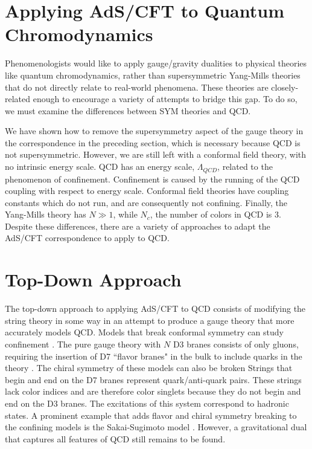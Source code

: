 \section{Applying AdS/CFT to Quantum Chromodynamics}

Phenomenologists would like to apply gauge/gravity dualities to physical theories like quantum chromodynamics, rather than supersymmetric Yang-Mills theories that do not directly relate to real-world phenomena.
These theories are closely-related enough to encourage a variety of attempts to bridge this gap.
To do so, we must examine the differences between SYM theories and QCD.

We have shown how to remove the supersymmetry aspect of the gauge theory in the correspondence in the preceding section, which is necessary because QCD is not supersymmetric.
However, we are still left with a conformal field theory, with no intrinsic energy scale.
QCD has an energy scale, $\Lambda_{QCD}$, related to the phenomenon of confinement.
Confinement is caused by the running of the QCD coupling with respect to energy scale.
Conformal field theories have coupling constants which do not run, and are consequently not confining.
Finally, the Yang-Mills theory has $N\gg 1$, while $N_c$, the number of colors in QCD is 3.
Despite these differences, there are a variety of approaches to adapt the AdS/CFT correspondence to apply to QCD.

\section{Top-Down Approach}

The top-down approach to applying AdS/CFT to QCD consists of modifying the string theory in some way in an attempt to produce a gauge theory that more accurately models QCD.
Models that break conformal symmetry can study confinement \cite{Babington2004,Ghoroku2004}.
The pure gauge theory with $N$ D3 branes consists of only gluons, requiring the insertion of D7 ``flavor branes" in the bulk to include quarks in the theory \cite{Karch2002}.
The chiral symmetry of these models can also be broken \cite{Kruczenski2004,Filev2007,Alvares2010}
Strings that begin and end on the D7 branes represent quark/anti-quark pairs.
These strings lack color indices and are therefore color singlets because they do not begin and end on the D3 branes.
The excitations of this system correspond to hadronic states.
A prominent example that adds flavor and chiral symmetry breaking to the confining models is the Sakai-Sugimoto model \cite{Sakai2005, Sakai2005a}.
However, a gravitational dual that captures all features of QCD still remains to be found.

